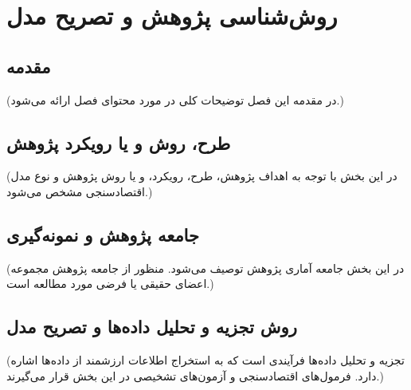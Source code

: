 \chapter{روش‌شناسی پژوهش و تصریح مدل}

\section{مقدمه}
(در مقدمه این فصل توضیحات کلی در مورد محتوای فصل ارائه می‌شود.)

\section{طرح، روش و یا رویکرد پژوهش}
(در این بخش با توجه به اهداف پژوهش، طرح، رویکرد، و یا روش پژوهش و نوع مدل اقتصادسنجی مشخص می‌شود.)

\section{جامعه پژوهش و نمونه‌گیری}
(در این بخش جامعه آماری پژوهش توصیف می‌شود. منظور از جامعه پژوهش مجموعه اعضای حقیقی یا فرضی مورد مطالعه است.)

\section{روش تجزیه و تحلیل داده‌ها و تصریح مدل}
(تجزیه و تحلیل داده‌ها فرآیندی است که به استخراج اطلاعات ارزشمند از داده‌ها اشاره دارد. فرمول‌های اقتصادسنجی و آزمون‌های تشخیصی در این بخش قرار می‌گیرند.)